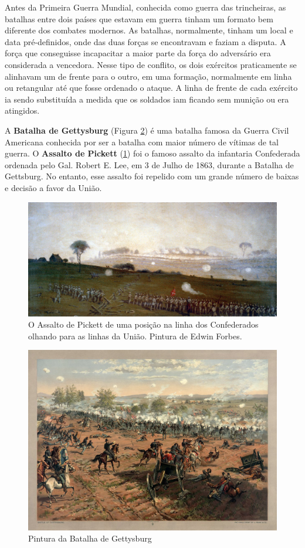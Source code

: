 \documentclass{article}
\begin{document}
Antes da Primeira Guerra Mundial, conhecida como guerra das trincheiras, as batalhas entre dois países que estavam em guerra tinham um formato bem diferente dos combates modernos. As batalhas, normalmente, tinham um local e data pré-definidos, onde das duas forças se encontravam e faziam a disputa. A força que conseguisse incapacitar a maior parte da força do adversário era considerada a vencedora. Nesse tipo de conflito, os dois exércitos praticamente se alinhavam um de frente para o outro, em uma formação, normalmente em linha ou retangular até que fosse ordenado o ataque. A linha de frente de cada exército ia sendo substituída a medida que os soldados iam ficando sem munição ou era atingidos. 

A \textbf{Batalha de Gettysburg} (Figura \ref{fig:gettysburg-battle}) é uma batalha famosa da Guerra Civil Americana conhecida por ser a batalha com maior número de vítimas de tal guerra. O \textbf{Assalto de Pickett} (\ref{fig:picketts-charge}) foi o famoso assalto da infantaria Confederada ordenada pelo Gal. Robert E. Lee, em 3 de Julho de 1863, durante a Batalha de Gettsburg. No entanto, esse assalto foi repelido com um grande número de baixas e decisão a favor da União.

\begin{figure}[ht]
	\centering
	\includegraphics[width=0.9\linewidth]{figs/edwin_forbes_picketts_charge_1420x654.jpg}
	\caption{O Assalto de Pickett de uma posição na linha dos Confederados olhando para as linhas da União. Pintura de Edwin Forbes.}
	\label{fig:picketts-charge}
\end{figure}

\begin{figure}[ht]
	\centering
	\includegraphics[width=0.7\linewidth]{figs/Battle_of_Gettysburg_1200x870.jpg}
	\caption{Pintura da Batalha de Gettysburg}
	\label{fig:gettysburg-battle}	
\end{figure}
\end{document}

